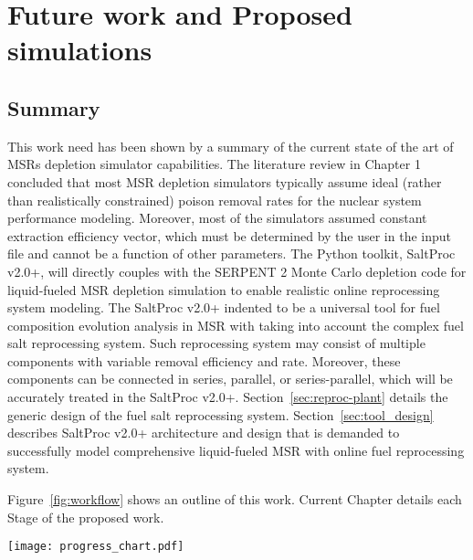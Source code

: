 \chapter[Future work and Proposed simulations]{Future work and Proposed 
simulations}

\section{Summary}
This work need has been shown by a summary of the current state of the 
art of \glspl{MSR} depletion simulator capabilities. The literature review in 
Chapter 1 concluded that most \gls{MSR} depletion simulators typically assume 
ideal (rather than realistically constrained) poison removal rates for the 
nuclear system performance modeling. Moreover, most of the simulators assumed 
constant extraction efficiency vector, which must be determined by the user in 
the input file and cannot be a function of other parameters. The Python 
toolkit, SaltProc v2.0+, will directly couples with the SERPENT 2 Monte Carlo 
depletion code for liquid-fueled \gls{MSR} depletion simulation to enable 
realistic online reprocessing system modeling. The SaltProc v2.0+ indented to 
be a universal tool for fuel composition evolution analysis in \gls{MSR} with 
taking into account the complex fuel salt reprocessing system. Such 
reprocessing system may consist of multiple components with variable removal 
efficiency and rate. Moreover, these components can be connected in series, 
parallel, or series-parallel, which will be accurately treated in the SaltProc 
v2.0+. Section~\ref{sec:reproc-plant} details the generic design of the fuel 
salt reprocessing system. Section~\ref{sec:tool_design} describes SaltProc 
v2.0+ architecture and design that is demanded to successfully model 
comprehensive liquid-fueled \gls{MSR} with online fuel reprocessing system. 

Figure~\ref{fig:workflow} shows an outline of this work. Current  
Chapter details each Stage of the proposed work.
 \begin{sidewaysfigure}[ht!] %
 	\centering
 	\texttt{[image: progress\_chart.pdf]} 
 	\caption{Workflow for the simulations proposed in this work..}
 	\label{fig:workflow}
 \end{sidewaysfigure}
 \FloatBarrier
 
 
